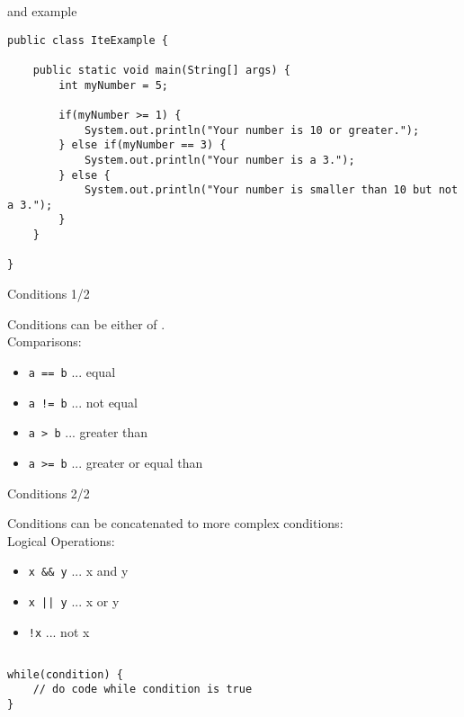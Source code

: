 \begin{frame}[fragile]{ and  example}
\begin{lstlisting}
public class IteExample {

    public static void main(String[] args) {
        int myNumber = 5;
        
        if(myNumber >= 1) {
            System.out.println("Your number is 10 or greater.");
        } else if(myNumber == 3) {
            System.out.println("Your number is a 3.");
        } else {
            System.out.println("Your number is smaller than 10 but not a 3.");
        }
    }
    
}\end{lstlisting}
\end{frame}

\begin{frame}{Conditions 1/2}

Conditions can be either  of .
\\[0.3in]

Comparisons:
\begin{itemize}
    \item \texttt{a == b} ... equal
    \item \texttt{a != b} ... not equal
    \item \texttt{a > b} ... greater than
    \item \texttt{a >= b} ... greater or equal than
\end{itemize}
\end{frame}

\begin{frame}{Conditions 2/2}

Conditions can be concatenated to more complex conditions:
\\[0.3in]

Logical Operations:
\begin{itemize}
    \item \texttt{x \&\& y} ... x and y
    \item \texttt{x || y} ... x or y
    \item \texttt{!x} ... not x
\end{itemize}
\end{frame}

\subsection{}
\begin{frame}[fragile]{}
\begin{lstlisting}
while(condition) {
    // do code while condition is true
}\end{lstlisting}
\end{frame}

